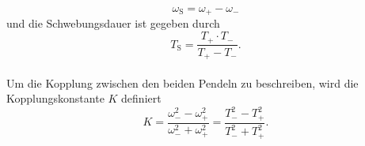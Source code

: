 \begin{enumerate}
\begin{equation}
          \omega_\text{S}=\omega_+ - \omega_-
        \end{equation}
        und die Schwebungsdauer ist gegeben durch
        \begin{equation}
          T_\text{S}=\frac{T_+\cdot T_-}{T_+-T_-}.
        \end{equation}
        \\
        Um die Kopplung zwischen den beiden Pendeln zu beschreiben, wird die Kopplungskonstante $K$ definiert
        \begin{equation}
          \label{eq:kopplungskonstante}
          K=\frac{\omega_-^2-\omega_+^2}{\omega_-^2+\omega_+^2}=\frac{T_-^2-T_+^2}{T_-^2+T_+^2}.
        \end{equation}
\end{enumerate}